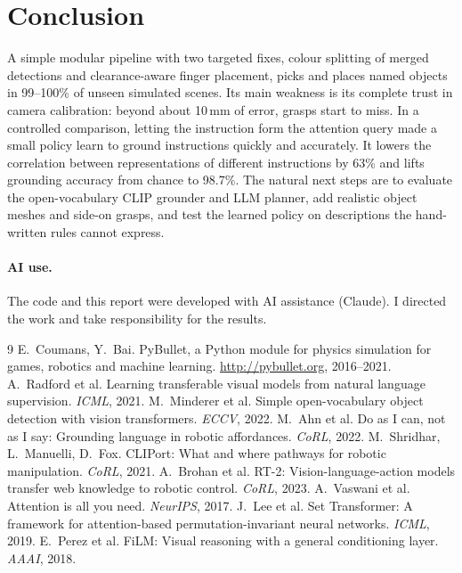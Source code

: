 \documentclass[10pt,a4paper]{article}
\begin{document}
\section{Conclusion}
A simple modular pipeline with two targeted fixes, colour splitting of merged
detections and clearance-aware finger placement, picks and places named objects
in 99--100\% of unseen simulated scenes. Its main weakness is its complete trust
in camera calibration: beyond about 10\,mm of error, grasps start to miss. In a controlled comparison, letting the instruction form the attention
query made a small policy learn to ground instructions quickly and accurately. It lowers
the correlation between representations of different instructions by 63\% and
lifts grounding accuracy from chance to 98.7\%. The natural next steps are to
evaluate the open-vocabulary CLIP grounder and LLM planner, add realistic object
meshes and side-on grasps, and test the learned policy on descriptions the
hand-written rules cannot express.

\paragraph{AI use.} The code and this report were developed with AI assistance
(Claude). I directed the work and take responsibility for the results.

\small
\begin{thebibliography}{9}\setlength{\itemsep}{0pt}
 E.~Coumans, Y.~Bai. PyBullet, a Python module for physics simulation for games, robotics and machine learning. \url{http://pybullet.org}, 2016--2021.
 A.~Radford et al. Learning transferable visual models from natural language supervision. \emph{ICML}, 2021.
 M.~Minderer et al. Simple open-vocabulary object detection with vision transformers. \emph{ECCV}, 2022.
 M.~Ahn et al. Do as I can, not as I say: Grounding language in robotic affordances. \emph{CoRL}, 2022.
 M.~Shridhar, L.~Manuelli, D.~Fox. CLIPort: What and where pathways for robotic manipulation. \emph{CoRL}, 2021.
 A.~Brohan et al. RT-2: Vision-language-action models transfer web knowledge to robotic control. \emph{CoRL}, 2023.
 A.~Vaswani et al. Attention is all you need. \emph{NeurIPS}, 2017.
 J.~Lee et al. Set Transformer: A framework for attention-based permutation-invariant neural networks. \emph{ICML}, 2019.
 E.~Perez et al. FiLM: Visual reasoning with a general conditioning layer. \emph{AAAI}, 2018.
\end{thebibliography}
\end{document}
